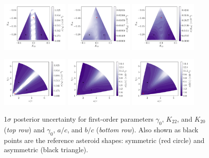 \documentclass[fleqn,usenatbib]{mnras}
\begin{document}
\begin{figure}
  \includegraphics[width=0.3\textwidth]{figs/probe-space-theta-1-sigma.pdf}\hfill
  \includegraphics[width=0.3\textwidth]{figs/probe-space-theta-2-sigma.pdf}\hfill
  \includegraphics[width=0.3\textwidth]{figs/probe-space-theta-3-sigma.pdf}

  \includegraphics[width=0.3\textwidth]{figs/probe-space-ab-1-sigma.pdf}\hfill
  \includegraphics[width=0.3\textwidth]{figs/probe-space-ab-a-sigma.pdf}\hfill
  \includegraphics[width=0.3\textwidth]{figs/probe-space-ab-b-sigma.pdf}

  \caption{1$\sigma$ posterior uncertainty for first-order parameters $\gamma_0$, $K_{22}$, and $K_{20}$ (\textit{top row}) and $\gamma_0$, $a/c$, and $b/c$ (\textit{bottom row}). Also shown as black points are the reference asteroid shapes: symmetric (red circle) and asymmetric (black triangle).}
  \label{fig:scan-space-sigma}
\end{figure}
\end{document}
